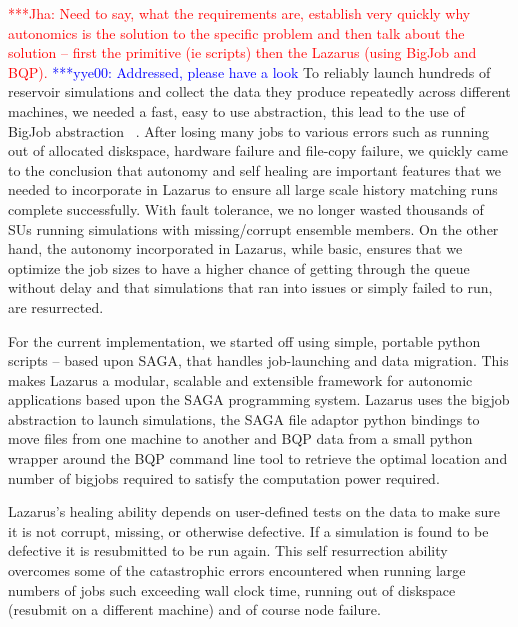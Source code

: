 \documentclass[conference,final]{IEEEtran}
\newcommand{\jhanote}[1]{ {\textcolor{red} { ***Jha: #1 }}}
\newcommand{\yyenote}[1]{ {\textcolor{blue} { ***yye00: #1 }}}
\newcommand{\jhanote}[1]{}
\newcommand{\yyenote}[1]{}
\begin{document}
\jhanote{Need to say, what the requirements are, establish very
  quickly why autonomics is the solution to the specific problem and
  then talk about the solution -- first the primitive (ie scripts)
  then the Lazarus (using BigJob and BQP).}
\yyenote{Addressed, please have a look}  
To reliably launch hundreds of reservoir simulations and collect the data
they produce repeatedly across different machines,
we needed a fast, easy to use abstraction, this lead to the use
of BigJob abstraction ~\cite{ICCS_paper, saga_royalsoc}.
After losing many jobs to various errors
such as running out of allocated diskspace, hardware failure
and file-copy failure, we quickly came to the conclusion that autonomy
and self healing are important features that we needed to incorporate 
in Lazarus to ensure all large scale history matching runs
complete successfully. With fault tolerance, we no longer wasted
thousands of SUs running simulations with missing/corrupt ensemble members.
On the other hand, the autonomy incorporated in Lazarus, while basic,
ensures that we optimize the job sizes to have a higher chance of getting
through the queue without delay and that simulations
that ran into issues or simply failed to run, are resurrected.

For the current implementation, we started off using simple, portable
python scripts -- based upon SAGA, that handles job-launching and data
migration. This makes Lazarus a modular,
scalable and extensible framework for autonomic applications based upon
the SAGA programming system.  Lazarus uses the bigjob
abstraction to launch simulations,
the SAGA file adaptor python bindings to move files from one machine
to another and BQP data from a small python wrapper around the BQP command line tool
to retrieve the optimal location and number of bigjobs required to satisfy the
computation power required.

Lazarus's healing ability depends on
user-defined tests on the data to make sure it
is not corrupt, missing, or otherwise defective. If a simulation is
found to be defective it is resubmitted to be run again. This self
resurrection ability overcomes some of the catastrophic errors
encountered when running large numbers of jobs such exceeding wall
clock time, running out of diskspace (resubmit on a different machine)
and of course node failure.
\end{document}
